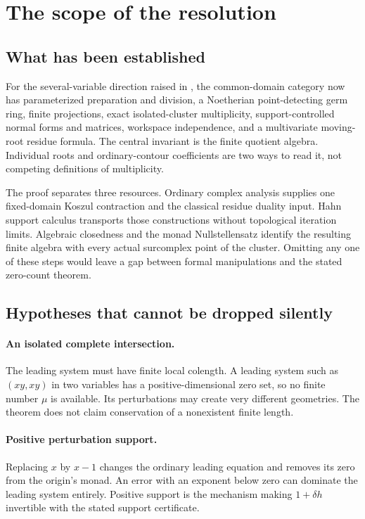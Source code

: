 \documentclass[11pt]{article}
\theoremstyle{definition}
\begin{document}
\section{The scope of the resolution}\label{sec:scope}
\subsection{What has been established}
For the several-variable direction raised in \cite{Source}, the common-domain category now has parameterized preparation and division, a Noetherian point-detecting germ ring, finite projections, exact isolated-cluster multiplicity, support-controlled normal forms and matrices, workspace independence, and a multivariate moving-root residue formula. The central invariant is the finite quotient algebra. Individual roots and ordinary-contour coefficients are two ways to read it, not competing definitions of multiplicity.

The proof separates three resources. Ordinary complex analysis supplies one fixed-domain Koszul contraction and the classical residue duality input. Hahn support calculus transports those constructions without topological iteration limits. Algebraic closedness and the monad Nullstellensatz identify the resulting finite algebra with every actual surcomplex point of the cluster. Omitting any one of these steps would leave a gap between formal manipulations and the stated zero-count theorem.

\subsection{Hypotheses that cannot be dropped silently}
\paragraph{An isolated complete intersection.}
The leading system must have finite local colength. A leading system such as $(xy,xy)$ in two variables has a positive-dimensional zero set, so no finite number $\mu$ is available. Its perturbations may create very different geometries. The theorem does not claim conservation of a nonexistent finite length.

\paragraph{Positive perturbation support.}
Replacing $x$ by $x-1$ changes the ordinary leading equation and removes its zero from the origin's monad. An error with an exponent below zero can dominate the leading system entirely. Positive support is the mechanism making $1+\delta h$ invertible with the stated support certificate.
\end{document}
